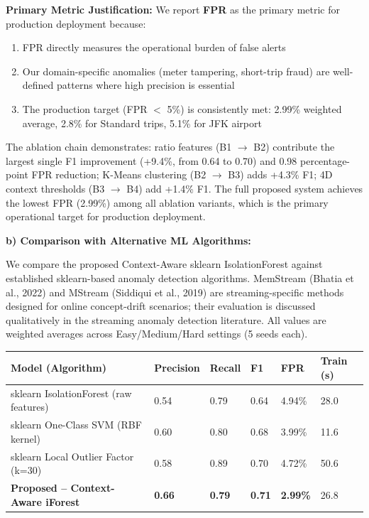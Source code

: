 \textbf{Primary Metric Justification:} We report \textbf{FPR} as the primary metric for production deployment because:
\begin{enumerate}
    \item FPR directly measures the operational burden of false alerts
    \item Our domain-specific anomalies (meter tampering, short-trip fraud) are well-defined patterns where high precision is essential
    \item The production target (FPR $<$ 5\%) is consistently met: 2.99\% weighted average, 2.8\% for Standard trips, 5.1\% for JFK airport
\end{enumerate}

The ablation chain demonstrates: ratio features (B1 $\to$ B2) contribute the largest single F1 improvement (+9.4\%, from 0.64 to 0.70) and 0.98 percentage-point FPR reduction; K-Means clustering (B2 $\to$ B3) adds +4.3\% F1; 4D context thresholds (B3 $\to$ B4) add +1.4\% F1. The full proposed system achieves the lowest FPR (2.99\%) among all ablation variants, which is the primary operational target for production deployment.

\textbf{b) Comparison with Alternative ML Algorithms:}

We compare the proposed Context-Aware sklearn IsolationForest against established sklearn-based anomaly detection algorithms. MemStream (Bhatia et al., 2022) and MStream (Siddiqui et al., 2019) are streaming-specific methods designed for online concept-drift scenarios; their evaluation is discussed qualitatively in the streaming anomaly detection literature. All values are weighted averages across Easy/Medium/Hard settings (5 seeds each).

\begin{longtable}{|m{4.5cm}|m{1.5cm}|m{1.5cm}|m{1.5cm}|m{1.5cm}|m{2cm}|}
\hline
\textbf{Model (Algorithm)} & \textbf{Precision} & \textbf{Recall} & \textbf{F1} & \textbf{FPR} & \textbf{Train (s)} \\ \hline
sklearn IsolationForest (raw features) & 0.54 & 0.79 & 0.64 & 4.94\% & 28.0 \\ \hline
sklearn One-Class SVM (RBF kernel) & 0.60 & 0.80 & 0.68 & 3.99\% & 11.6 \\ \hline
sklearn Local Outlier Factor (k=30) & 0.58 & 0.89 & 0.70 & 4.72\% & 50.6 \\ \hline
\textbf{Proposed -- Context-Aware iForest} & \textbf{0.66} & \textbf{0.79} & \textbf{0.71} & \textbf{2.99\%} & 26.8 \\ \hline
\end{longtable}

